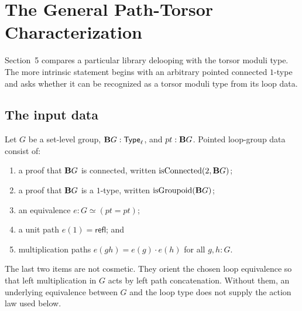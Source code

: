 \section{The General Path-Torsor Characterization}
\label{ch:path-torsors}

Section~5 compares a particular library delooping with the torsor moduli type. The more intrinsic statement begins with an arbitrary pointed connected $1$-type and asks whether it can be recognized as a torsor moduli type from its loop data.

\subsection{The input data}
\begin{definition}
Let $G$ be a set-level group, $\mathbf{B}G: \mathsf{Type}_\ell$, and $pt:\mathbf{B}G$. Pointed loop-group data consist of:
\begin{enumerate}[label=\textup{(\roman*)}]
\item a proof that $\mathbf{B}G$ is connected, written $\operatorname{isConnected}(2,\mathbf{B}G)$;
\item a proof that $\mathbf{B}G$ is a $1$-type, written $\operatorname{isGroupoid}(\mathbf{B}G)$;
\item an equivalence $e:G\simeq(pt=pt)$;
\item a unit path $e(1)=\mathsf{refl}$; and
\item multiplication paths $e(gh)=e(g)\mathbin{\cdot}e(h)$ for all $g,h:G$.
\end{enumerate}
\end{definition}

The last two items are not cosmetic. They orient the chosen loop equivalence so that left multiplication in $G$ acts by left path concatenation. Without them, an underlying equivalence between $G$ and the loop type does not supply the action law used below.


